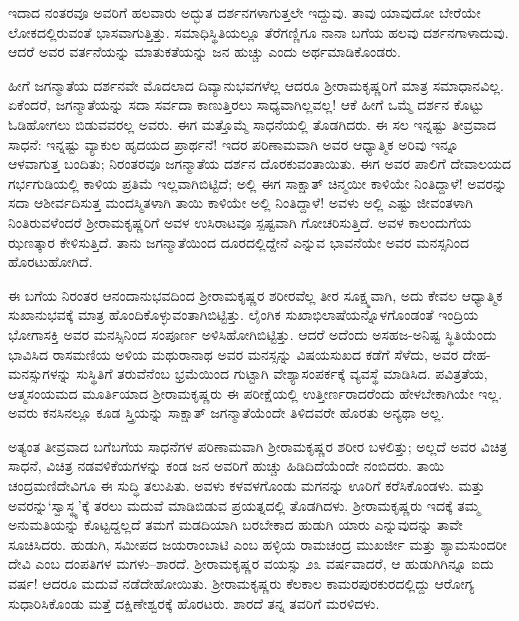 ಇದಾದ ನಂತರವೂ ಅವರಿಗೆ ಹಲವಾರು ಅದ್ಭುತ ದರ್ಶನಗಳಾಗುತ್ತಲೇ ಇದ್ದುವು. ತಾವು ಯಾವುದೋ ಬೇರೆಯೇ ಲೋಕದಲ್ಲಿರುವಂತೆ ಭಾಸವಾಗುತ್ತಿತ್ತು. ಸಮಾಧಿಸ್ಥಿತಿಯಲ್ಲೂ ತೆರೆಗಣ್ಣಿಗೂ ನಾನಾ ಬಗೆಯ ಹಲವು ದರ್ಶನಗಾಳಾದುವು. ಆದರೆ ಅವರ ವರ್ತನೆಯನ್ನು ಮಾತುಕತೆಯನ್ನು ಜನ ಹುಚ್ಚು ಎಂದು ಅರ್ಥಮಾಡಿಕೊಂಡರು.

ಹೀಗೆ ಜಗನ್ಮಾತೆಯ ದರ್ಶನವೇ ಮೊದಲಾದ ದಿವ್ಯಾನುಭವಗಳೆಲ್ಲ ಆದರೂ ಶ್ರೀರಾಮಕೃಷ್ಣರಿಗೆ ಮಾತ್ರ ಸಮಾಧಾನವಿಲ್ಲ. ಏಕೆಂದರೆ, ಜಗನ್ಮಾತೆಯನ್ನು ಸದಾ ಸರ್ವದಾ ಕಾಣುತ್ತಿರಲು ಸಾಧ್ಯವಾಗಿಲ್ಲವಲ್ಲ! ಆಕೆ ಹೀಗೆ ಒಮ್ಮೆ ದರ್ಶನ ಕೊಟ್ಟು ಓಡಿಹೋಗಲು ಬಿಡುವವರಲ್ಲ ಅವರು. ಈಗ ಮತ್ತೊಮ್ಮೆ ಸಾಧನೆಯಲ್ಲಿ ತೊಡಗಿದರು. ಈ ಸಲ ಇನ್ನಷ್ಟು ತೀವ್ರವಾದ ಸಾಧನೆ: ಇನ್ನಷ್ಟು ವ್ಯಾಕುಲ ಹೃದಯದ ಪ್ರಾರ್ಥನೆ! ಇದರ ಪರಿಣಾಮವಾಗಿ ಅವರ ಆಧ್ಯಾತ್ಮಿಕ ಅರಿವು ಇನ್ನೂ ಆಳವಾಗುತ್ತ ಬಂದಿತು; ನಿರಂತರವೂ ಜಗನ್ಮಾತೆಯ ದರ್ಶನ ದೊರಕುವಂತಾಯಿತು. ಈಗ ಅವರ ಪಾಲಿಗೆ ದೇವಾಲಯದ ಗರ್ಭಗುಡಿಯಲ್ಲಿ ಕಾಳಿಯ ಪ್ರತಿಮೆ ಇಲ್ಲವಾಗಿಬಿಟ್ಟಿದೆ; ಅಲ್ಲಿ ಈಗ ಸಾಕ್ಷಾತ್ ಚಿನ್ಮಯೀ ಕಾಳಿಯೇ ನಿಂತಿದ್ದಾಳೆ! ಅವರನ್ನು ಸದಾ ಆಶೀರ್ವದಿಸುತ್ತ ಮಂದಸ್ಮಿತಳಾಗಿ ತಾಯಿ ಕಾಳಿಯೇ ಅಲ್ಲಿ ನಿಂತಿದ್ದಾಳೆ! ಅವಳು ಅಲ್ಲಿ ಎಷ್ಟು ಜೀವಂತಳಾಗಿ ನಿಂತಿರುವಳೆಂದರೆ ಶ್ರೀರಾಮಕೃಷ್ಣರಿಗೆ ಅವಳ ಉಸಿರಾಟವೂ ಸ್ಪಷ್ಟವಾಗಿ ಗೋಚರಿಸುತ್ತಿದೆ. ಅವಳ ಕಾಲಂದುಗೆಯ ಝಣತ್ಕಾರ ಕೇಳಿಸುತ್ತಿದೆ. ತಾನು ಜಗನ್ಮಾತೆಯಿಂದ ದೂರದಲ್ಲಿದ್ದೇನೆ ಎನ್ನುವ ಭಾವನೆಯೇ ಅವರ ಮನಸ್ಸನಿಂದ ಹೊರಟುಹೋಗಿದೆ.

ಈ ಬಗೆಯ ನಿರಂತರ ಆನಂದಾನುಭವದಿಂದ ಶ್ರೀರಾಮಕೃಷ್ಣರ ಶರೀರವೆಲ್ಲ ತೀರ ಸೂಕ್ಷ್ಮವಾಗಿ, ಅದು ಕೇವಲ ಆಧ್ಯಾತ್ಮಿಕ ಸುಖಾನುಭವಕ್ಕೆ ಮಾತ್ರ ಹೊಂದಿಕೊಳ್ಳುವಂತಾಗಿಬಿಟ್ಟಿತ್ತು. ಲೈಂಗಿಕ ಸುಖಾಭಿಲಾಷೆಯನ್ನೊಳಗೊಂಡಂತೆ ಇಂದ್ರಿಯ ಭೋಗಾಸಕ್ತಿ ಅವರ ಮನಸ್ಸಿನಿಂದ ಸಂಪೂರ್ಣ ಅಳಿಸಿಹೋಗಿಬಿಟ್ಟಿತ್ತು. ಆದರೆ ಅದೆಂದು ಅಸಹಜ-ಅನಿಷ್ಟ ಸ್ಥಿತಿಯೆಂದು ಭಾವಿಸಿದ ರಾಸಮಣಿಯ ಅಳಿಯ ಮಥುರಾನಾಥ ಅವರ ಮನಸ್ಸನ್ನು ವಿಷಯಸುಖದ ಕಡೆಗೆ ಸೆಳೆದು, ಅವರ ದೇಹ-ಮನಸ್ಸುಗಳನ್ನು ಸುಸ್ಥಿತಿಗೆ ತರುವೆನೆಂಬ ಭ್ರಮೆಯಿಂದ ಗುಟ್ಟಾಗಿ ವೇಶ್ಯಾಸಂಪರ್ಕಕ್ಕೆ ವ್ಯವಸ್ಥೆ ಮಾಡಿಸಿದ. ಪವಿತ್ರತೆಯ, ಆತ್ಮಸಂಯಮದ ಮೂರ್ತಿಯಾದ ಶ್ರೀರಾಮಕೃಷ್ಣರು ಈ ಪರೀಕ್ಷೆಯಲ್ಲಿ ಉತ್ತೀರ್ಣರಾದರೆಂದು ಹೇಳಬೇಕಾಗಿಯೇ ಇಲ್ಲ. ಅವರು ಕನಸಿನಲ್ಲೂ ಕೂಡ ಸ್ತ್ರಿಯನ್ನು ಸಾಕ್ಷಾತ್ ಜಗನ್ಮಾತೆಯೆಂದೇ ತಿಳಿದವರೇ ಹೊರತು ಅನ್ಯಥಾ ಅಲ್ಲ.

ಅತ್ಯಂತ ತೀವ್ರವಾದ ಬಗೆಬಗೆಯ ಸಾಧನೆಗಳ ಪರಿಣಾಮವಾಗಿ ಶ್ರೀರಾಮಕೃಷ್ಣರ ಶರೀರ ಬಳಲಿತ್ತು; ಅಲ್ಲದೆ ಅವರ ವಿಚಿತ್ರ ಸಾಧನೆ, ವಿಚಿತ್ರ ನಡವಳಿಕೆಯಗಳನ್ನು ಕಂಡ ಜನ ಅವರಿಗೆ ಹುಚ್ಚು ಹಿಡಿದಿದೆಯೆಂದೇ ನಂಬಿದರು. ತಾಯಿ ಚಂದ್ರಮಣಿದೇವಿಗೂ ಈ ಸುದ್ಧಿ ತಲುಪಿತು. ಅವಳು ಕಳವಳಗೊಂಡು ಮಗನನ್ನು ಊರಿಗೆ ಕರೆಸಿಕೊಂಡಳು. ಮತ್ತು ಅವರನ್ನು‘ಸ್ವಾಸ್ಥ್ಯ’ಕ್ಕೆ ತರಲು ಮದುವೆ ಮಾಡಿಬಿಡುವ ಪ್ರಯತ್ನದಲ್ಲಿ ತೊಡಗಿದಳು. ಶ್ರೀರಾಮಕೃಷ್ಣರು ಇದಕ್ಕೆ ತಮ್ಮ ಅನುಮತಿಯನ್ನು ಕೊಟ್ಟದ್ದಲ್ಲದೆ ತಮಗೆ ಮಡದಿಯಾಗಿ ಬರಬೇಕಾದ ಹುಡುಗಿ ಯಾರು ಎನ್ನುವುದನ್ನು ತಾವೇ ಸೂಚಿಸಿದರು. ಹುಡುಗಿ, ಸಮೀಪದ ಜಯರಾಂಬಾಟಿ ಎಂಬ ಹಳ್ಳಿಯ ರಾಮಚಂದ್ರ ಮುಖರ್ಜೀ ಮತ್ತು ಶ್ಯಾಮಸುಂದರೀ ದೇವಿ ಎಂಬ ದಂಪತಿಗಳ ಮಗಳು–ಶಾರದೆ. ಶ್ರೀರಾಮಕೃಷ್ಣರ ವಯಸ್ಸು ೨೩ ವರ್ಷವಾದರೆ, ಆ ಹುಡುಗಿಗಿನ್ನೂ ಐದು ವರ್ಷ! ಆದರೂ ಮದುವೆ ನಡೆದೇಹೋಯಿತು. ಶ್ರೀರಾಮಕೃಷ್ಣರು ಕೆಲಕಾಲ ಕಾಮರಪುರಕುರದಲ್ಲಿದ್ದು ಆರೋಗ್ಯ ಸುಧಾರಿಸಿಕೊಂಡು ಮತ್ತೆ ದಕ್ಷಿಣೇಶ್ವರಕ್ಕೆ ಹೊರಟರು. ಶಾರದೆ ತನ್ನ ತವರಿಗೆ ಮರಳಿದಳು.

